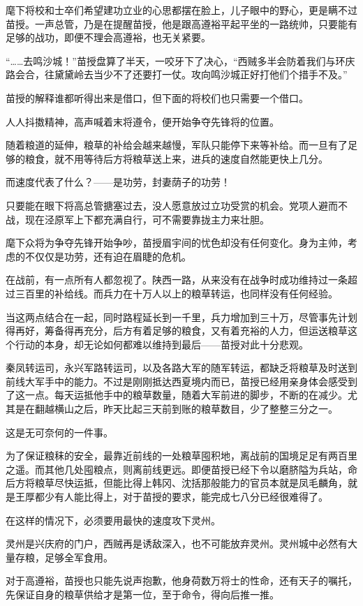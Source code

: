 麾下将校和士卒们希望建功立业的心思都摆在脸上，儿子眼中的野心，更是瞒不过苗授。一声总管，乃是在提醒苗授，他是跟高遵裕平起平坐的一路统帅，只要能有足够的战功，即便不理会高遵裕，也无关紧要。

“……去鸣沙城！”苗授盘算了半天，一咬牙下了决心，“西贼多半会防着我们与环庆路会合，往黛黛岭去当少不了还要打一仗。攻向鸣沙城正好打他们个措手不及。”

苗授的解释谁都听得出来是借口，但下面的将校们也只需要一个借口。

人人抖擞精神，高声喊着末将遵令，便开始争夺先锋将的位置。

随着粮道的延伸，粮草的补给会越来越慢，军队只能停下来等补给。而一旦有了足够的粮食，就不用等待后方将粮草送上来，进兵的速度自然能更快上几分。

而速度代表了什么？——是功劳，封妻荫子的功劳！

只要能在眼下将高总管搪塞过去，没人愿意放过立功受赏的机会。党项人避而不战，现在泾原军上下都充满自行，可不需要靠拢主力来壮胆。

麾下众将为争夺先锋开始争吵，苗授眉宇间的忧色却没有任何变化。身为主帅，考虑的不仅仅是功劳，还有迫在眉睫的危机。

在战前，有一点所有人都忽视了。陕西一路，从来没有在战争时成功维持过一条超过三百里的补给线。而兵力在十万人以上的粮草转运，也同样没有任何经验。

当这两点结合在一起，同时路程延长到一千里，兵力增加到三十万，尽管事先计划得再好，筹备得再充分，后方有着足够的粮食，又有着充裕的人力，但运送粮草这个行动的本身，却无论如何都难以维持到最后——苗授对此十分悲观。

秦凤转运司，永兴军路转运司，以及各路大军的随军转运，都缺乏将粮草及时送到前线大军手中的能力。不过是刚刚抵达西夏境内而已，苗授已经用亲身体会感受到了这一点。每天运抵他手中的粮草数量，随着大军前进的脚步，不断的在减少。尤其是在翻越横山之后，昨天比起三天前到账的粮草数目，少了整整三分之一。

这是无可奈何的一件事。

为了保证粮秣的安全，最靠近前线的一处粮草囤积地，离战前的国境足足有两百里之遥。而其他几处囤粮点，则离前线更远。即便苗授已经下令以磨脐隘为兵站，命后方将粮草尽快运抵，但能比得上韩冈、沈括那般能力的官员本就是凤毛麟角，就是王厚都少有人能比得上，对于苗授的要求，能完成七八分已经很难得了。

在这样的情况下，必须要用最快的速度攻下灵州。

灵州是兴庆府的门户，西贼再是诱敌深入，也不可能放弃灵州。灵州城中必然有大量存粮，足够全军食用。

对于高遵裕，苗授也只能先说声抱歉，他身荷数万将士的性命，还有天子的嘱托，先保证自身的粮草供给才是第一位，至于命令，得向后推一推。

